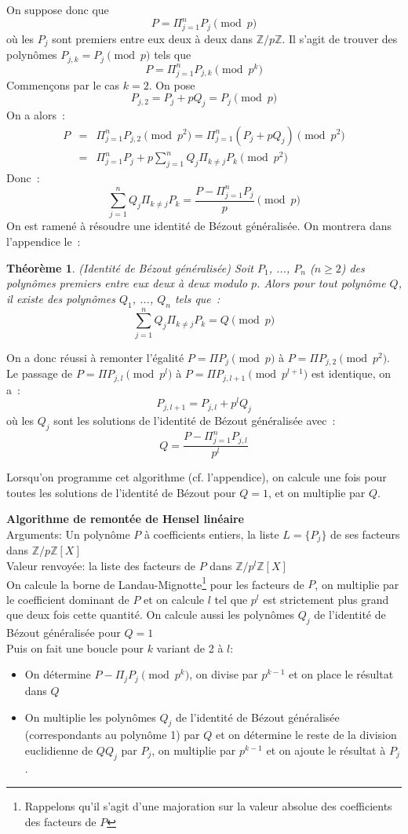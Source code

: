 \documentclass[a4paper,11pt]{article}
\newtheorem{thm}{Théorème}
\begin{document}
\begin{giacjshere}
On suppose donc que
\[ P=\Pi_{j=1}^n P_j \pmod p \]
où les $P_j$ sont premiers entre eux deux à deux dans $\mathbb{Z}/p\mathbb{Z}$.
Il s'agit de trouver des polynômes $P_{j,k}=P_j \pmod p$ tels que
\[ P=\Pi_{j=1}^n P_{j,k} \pmod {p^k} \]
Commençons par le cas $k=2$. On pose
\[ P_{j,2}=P_j+pQ_j=P_j \pmod p \]
On a alors~:
\begin{eqnarray*}
 P&=&\Pi_{j=1}^n P_{j,2} \pmod {p^2} =\Pi_{j=1}^n (P_j+pQ_j) \pmod {p^2}\\
&=&\Pi_{j=1}^n P_j + p \sum_{j=1}^n Q_j \Pi_{k\neq j} P_k \pmod {p^2} 
\end{eqnarray*}
Donc~:
\[ \sum_{j=1}^n Q_j \Pi_{k\neq j} P_k= \frac{P-\Pi_{j=1}^n P_j}{p} \pmod p \]
On est ramené à résoudre une identité de Bézout généralisée.
On montrera dans l'appendice le~:
\begin{thm} (Identité de Bézout généralisée)
Soit $P_1$, ..., $P_n$ ($n\geq 2$) des polynômes premiers entre eux deux 
à deux modulo $p$. Alors pour tout polynôme $Q$, il existe des polynômes 
$Q_1$, ..., $Q_n$ tels que~:
\[ \sum_{j=1}^n Q_j \Pi_{k\neq j} P_k=Q \pmod p \]
\end{thm}


On a donc réussi à remonter l'égalité $P=\Pi P_j \pmod p$ à 
$P=\Pi P_{j,2} \pmod {p^2}$. Le passage de $P=\Pi P_{j,l} \pmod {p^l}$
à $P=\Pi P_{j,l+1} \pmod {p^{l+1}}$ est identique, on a~:
\[ P_{j,l+1}=P_{j,l}+p^{l}Q_j \]
où les $Q_j$ sont les solutions de l'identité de Bézout généralisée avec~:
\[ Q=\frac{P-\Pi_{j=1}^n P_{j,l}}{p^l}\]

Lorsqu'on programme cet algorithme (cf. l'appendice), 
on calcule une fois pour toutes les
solutions de l'identité de Bézout pour $Q=1$, et on multiplie par $Q$.

{\bf Algorithme de remontée de Hensel linéaire}\\
Arguments: Un polynôme $P$ à coefficients entiers, la liste $L=\{ P_j \}$ 
de ses facteurs dans $\mathbb{Z}/p\mathbb{Z}[X]$\\
Valeur renvoyée: la liste des facteurs de $P$ dans $\mathbb{Z}/p^l \mathbb{Z}[X]$\\
On calcule la borne de Landau-Mignotte\footnote{Rappelons qu'il s'agit d'une
majoration sur la valeur absolue des coefficients des facteurs de $P$} 
pour les facteurs de $P$, on multiplie
par le coefficient dominant de $P$ et on calcule $l$ tel que $p^l$ est
strictement plus grand que deux fois cette quantité. On calcule
aussi les polynômes $Q_j$ de l'identité de Bézout généralisée pour $Q=1$\\
Puis on fait une boucle pour $k$ variant de 2 à $l$:
\begin{itemize}
\item On détermine $P-\Pi_j P_j \pmod {p^{k}}$, on divise par $p^{k-1}$
et on place le résultat dans $Q$
\item On multiplie les polynômes $Q_j$ de l'identité de Bézout 
généralisée (correspondants au polynôme 1) par $Q$
et on détermine le reste de la division euclidienne de $Q Q_j$ par $P_j$,
on multiplie par $p^{k-1}$ et on ajoute le résultat à $P_j$.
\end{itemize}


\end{giacjshere}
\end{document}

